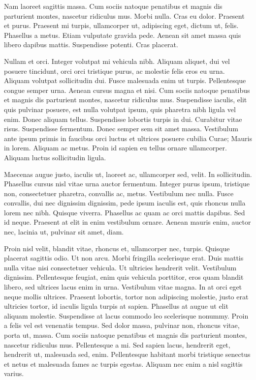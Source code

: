 \documentclass[printmode]{mgr}
\begin{document}
Nam laoreet sagittis massa. Cum sociis natoque penatibus et magnis dis
parturient montes, nascetur ridiculus mus. Morbi nulla. Cras eu
dolor. Praesent et purus. Praesent mi turpis, ullamcorper ut,
adipiscing eget, dictum ut, felis. Phasellus a metus. Etiam vulputate
gravida pede. Aenean sit amet massa quis libero dapibus
mattis. Suspendisse potenti. Cras placerat.

Nullam et orci. Integer volutpat mi vehicula nibh. Aliquam aliquet,
dui vel posuere tincidunt, orci orci tristique purus, ac molestie
felis eros eu urna. Aliquam volutpat sollicitudin dui. Fusce malesuada
enim ut turpis. Pellentesque congue semper urna. Aenean cursus magna
et nisi. Cum sociis natoque penatibus et magnis dis parturient montes,
nascetur ridiculus mus. Suspendisse iaculis, elit quis pulvinar
posuere, est nulla volutpat ipsum, quis pharetra nibh ligula vel
enim. Donec aliquam tellus. Suspendisse lobortis turpis in
dui. Curabitur vitae risus. Suspendisse fermentum. Donec semper sem
sit amet massa. Vestibulum ante ipsum primis in faucibus orci luctus
et ultrices posuere cubilia Curae; Mauris in lorem. Aliquam ac
metus. Proin id sapien eu tellus ornare ullamcorper. Aliquam luctus
sollicitudin ligula.

Maecenas augue justo, iaculis ut, laoreet ac, ullamcorper sed,
velit. In sollicitudin. Phasellus cursus nisl vitae urna auctor
fermentum. Integer purus ipsum, tristique non, consectetuer pharetra,
convallis ac, metus. Vestibulum nec nulla. Fusce convallis, dui nec
dignissim dignissim, pede ipsum iaculis est, quis rhoncus nulla lorem
nec nibh. Quisque viverra. Phasellus ac quam ac orci mattis
dapibus. Sed id neque. Praesent at elit in enim vestibulum
ornare. Aenean mauris enim, auctor nec, lacinia ut, pulvinar sit amet,
diam.

Proin nisl velit, blandit vitae, rhoncus et, ullamcorper nec,
turpis. Quisque placerat sagittis odio. Ut non arcu. Morbi fringilla
scelerisque erat. Duis mattis nulla vitae nisi consectetuer
vehicula. Ut ultricies hendrerit velit. Vestibulum
dignissim. Pellentesque feugiat, enim quis vehicula porttitor, eros
quam blandit libero, sed ultrices lacus enim in urna. Vestibulum vitae
magna. In at orci eget neque mollis ultrices. Praesent lobortis,
tortor non adipiscing molestie, justo erat ultricies tortor, id
iaculis ligula turpis at sapien. Phasellus at augue ut elit aliquam
molestie. Suspendisse at lacus commodo leo scelerisque nonummy. Proin
a felis vel est venenatis tempus. Sed dolor massa, pulvinar non,
rhoncus vitae, porta ut, massa. Cum sociis natoque penatibus et magnis
dis parturient montes, nascetur ridiculus mus. Pellentesque a mi. Sed
sapien lacus, hendrerit eget, hendrerit ut, malesuada sed,
enim. Pellentesque habitant morbi tristique senectus et netus et
malesuada fames ac turpis egestas. Aliquam nec enim a nisl sagittis
varius.
\end{document}
